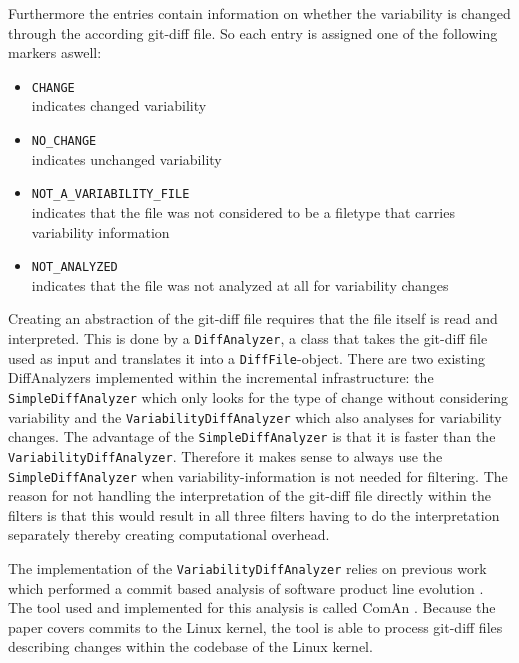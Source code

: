 \documentclass[a4paper]{article}
\begin{document}
Furthermore the entries contain information on whether the variability is changed through the according git-diff file. So each entry is assigned one of the following markers aswell:

\begin{itemize}
	\item \texttt{CHANGE} \\
	      indicates changed variability
	\item \texttt{NO\_CHANGE} \\
	      indicates unchanged variability
	\item \texttt{NOT\_A\_VARIABILITY\_FILE}\\
	      indicates that the file was not considered to be a filetype that carries variability information
	\item \texttt{NOT\_ANALYZED}\\
	      indicates that the file was not analyzed at all for variability changes
\end{itemize}

Creating an abstraction of the git-diff file requires that the file itself is read and interpreted. This is done by a \texttt{DiffAnalyzer}, a class that takes the git-diff file used as input and translates it into a \texttt{DiffFile}-object. There are two existing DiffAnalyzers implemented within the incremental infrastructure: the \texttt{SimpleDiffAnalyzer} which only looks for the type of change without considering variability and the \texttt{VariabilityDiffAnalyzer} which also analyses for variability changes. The advantage of the \texttt{SimpleDiffAnalyzer} is that it is faster than the \texttt{VariabilityDiffAnalyzer}. 
Therefore it makes sense to always use the \texttt{SimpleDiffAnalyzer} when variability-information is not needed for filtering. The reason for not handling the interpretation of the git-diff file directly within the filters is that this would result in all three filters having to do the interpretation separately thereby creating computational overhead.

The implementation of the \texttt{VariabilityDiffAnalyzer} relies on previous work which performed a commit based analysis of software product line evolution \cite{ComAn}. The tool used and implemented for this analysis  is called ComAn \cite{ComAn-tool}. Because the paper covers commits to the Linux kernel, the tool is able to process git-diff files describing changes within the codebase of the Linux kernel. 
\end{document}
